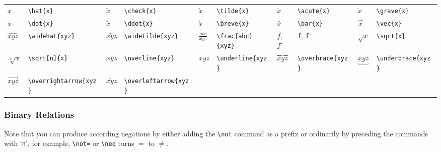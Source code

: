\documentclass[10pt, english]{article}
\begin{document}
	\begin{center}
		\scriptsize
	\begin{tabular}{ll|ll|ll|ll|ll}
		$\hat{x}$ & \verb|\hat{x}| & $\check{x}$ & \verb|\check{x}| & $\tilde{x}$ & \verb|\tilde{x}| & $\acute{x}$ & \verb|\acute{x}| & $\grave{x}$ & \verb|\grave{x}|\\
		$\dot{x}$ & \verb|\dot{x}| & $\ddot{x}$ & \verb|\ddot{x}| & $\breve{x}$ & \verb|\breve{x}| & $\bar{x}$ & \verb|\bar{x}| & $\vec{x}$ & \verb|\vec{x}|\\
		$\widehat{xyz}$ & \verb|\widehat{xyz}| & $\widetilde{xyz}$ & \verb|\widetilde{xyz}| & $\frac{abc}{xyz}$ & \verb|\frac{abc}{xyz}| & $f$, $f'$ & \verb|f|, \verb|f'| & $\sqrt{x}$ & \verb|\sqrt{x}|\\
		$\sqrt[n]{x}$ & \verb|\sqrt[n]{x}| & $\overline{xyz}$ & \verb|\overline{xyz}| & $\underline{xyz}$ & \verb|\underline{xyz}| & $\overbrace{xyz}$ & \verb|\overbrace{xyz}| & $\underbrace{xyz}$ & \verb|\underbrace{xyz}|\\
		$\overrightarrow{xyz}$ & \verb|\overrightarrow{xyz}| & $\overleftarrow{xyz}$ & \verb|\overleftarrow{xyz}| \\
	\end{tabular}
	\end{center}

\subsubsection*{Binary Relations}

	Note that you can produce according negations by either adding the \verb|\not| command as a prefix or ordinarily by preceding the commands with `\verb|n|', for example, \verb|\not=| or \verb|\neq| turns $=$ to $\neq$.
\end{document}
